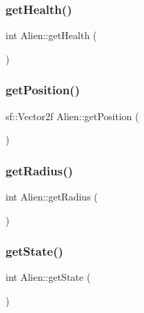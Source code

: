 \mbox{\label{class_alien_aa83dd26e21c40429865e3f84018545a0}} 
\subsubsection{\texorpdfstring{get\+Health()}{getHealth()}}
{\footnotesize\ttfamily int Alien\+::get\+Health (\begin{DoxyParamCaption}{ }\end{DoxyParamCaption})}

\mbox{\label{class_alien_a52dc07105cf8ff2a25961ecebf9fbbe1}} 
\subsubsection{\texorpdfstring{get\+Position()}{getPosition()}}
{\footnotesize\ttfamily sf\+::\+Vector2f Alien\+::get\+Position (\begin{DoxyParamCaption}{ }\end{DoxyParamCaption})}

\mbox{\label{class_alien_ab649dc3a1c86463c29b32931683685ab}} 
\subsubsection{\texorpdfstring{get\+Radius()}{getRadius()}}
{\footnotesize\ttfamily int Alien\+::get\+Radius (\begin{DoxyParamCaption}{ }\end{DoxyParamCaption})}

\mbox{\label{class_alien_a4954611d3a021f57a02564f17a3b0efc}} 
\subsubsection{\texorpdfstring{get\+State()}{getState()}}
{\footnotesize\ttfamily int Alien\+::get\+State (\begin{DoxyParamCaption}{ }\end{DoxyParamCaption})}

